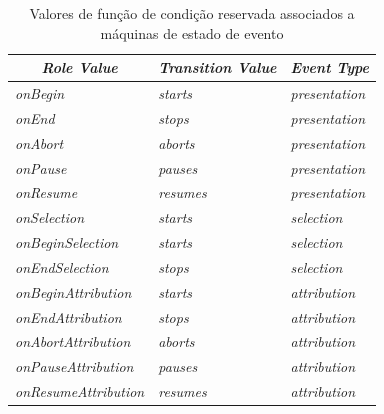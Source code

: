 \begin{table}[!ht] \footnotesize
\caption{Valores de função de condição reservada associados a máquinas de estado de evento \cite{ITU:2009ma}}
\label{tab:papeis}
\centering
{
 \renewcommand\arraystretch{1.0}
 \begin{tabular}{|p{4.5cm}|p{6cm}|p{4cm}|} \hline
  \multicolumn{1}{|c|}{\textit{Role Value}} & \multicolumn{1}{c|}{\textit{Transition Value}} & \multicolumn{1}{c|}{ \textit{Event Type}} \\\hline 
    \textit{onBegin} & \textit{starts} & \textit{presentation} \\\hline
    \textit{onEnd} & \textit{stops} & \textit{presentation} \\\hline
    \textit{onAbort} & \textit{aborts} & \textit{presentation}\\\hline
    \textit{onPause} & \textit{pauses} & \textit{presentation}\\\hline
    \textit{onResume} & \textit{resumes} & \textit{presentation}\\\hline
    \textit{onSelection} & \textit{starts} & \textit{selection}\\\hline
    \textit{onBeginSelection} & \textit{starts} & \textit{selection}\\\hline
    \textit{onEndSelection} & \textit{stops} & \textit{selection}\\\hline
    \textit{onBeginAttribution} & \textit{starts} & \textit{attribution}\\\hline
    \textit{onEndAttribution} & \textit{stops} & \textit{attribution}\\\hline
    \textit{onAbortAttribution} & \textit{aborts} & \textit{attribution}\\\hline
    \textit{onPauseAttribution} & \textit{pauses} & \textit{attribution}\\\hline
    \textit{onResumeAttribution} & \textit{resumes} & \textit{attribution}\\\hline
  \end{tabular}
}
\end{table}


